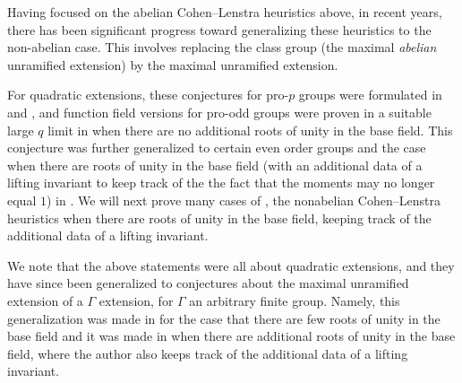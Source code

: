 \documentclass[12 pt]{amsart}
\theoremstyle{plain}
\theoremstyle{definition}
\theoremstyle{remark}
\numberwithin{equation}{section}
\begin{document}
Having focused on the abelian Cohen--Lenstra heuristics above, 
in recent years, there has been significant progress toward generalizing these
heuristics to the non-abelian case. This involves replacing the class group (the
maximal {\em abelian} unramified extension) by the maximal unramified extension.

For quadratic extensions, these conjectures for pro-$p$ groups were formulated in
\cite{bostonBH:heuristics-imaginary} and \cite{bostonBH:heuristics-real},
and function field versions for pro-odd groups were proven in a suitable large $q$ limit in
\cite{bostonW:non-abelian-cohen-lenstra-heuristics} when there are no additional
roots of unity in the base field.
This conjecture was further generalized to certain even order groups and the
case when there are roots of unity in the
base field (with an additional data of a lifting invariant to keep track of the the fact
that the moments may no longer equal $1$) in
\cite{wood:nonabelian-cohen-lenstra-moments}.
We will next prove many cases of \cite[Conjecture
5.1]{wood:nonabelian-cohen-lenstra-moments},
the nonabelian Cohen--Lenstra heuristics when there are roots of unity in the
base field, keeping track of the additional data of a lifting invariant.

We note that the above statements were all about quadratic extensions, and they
have since been generalized to conjectures about the maximal unramified
extension of a $\Gamma$ extension, for $\Gamma$ an arbitrary finite group.
Namely, this generalization was made in
\cite{liuWZB:a-predicted-distribution}
for the case that there are few roots of unity in the base field and it was made
in
\cite{liu:non-abelian-cohen-lenstra-in-the-presence-of-roots}
when there are additional roots of unity in the base field, where the author
also keeps track of the additional data of a lifting invariant.
\end{document}
